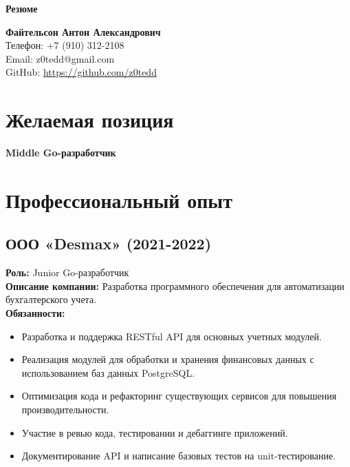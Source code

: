\documentclass[a4paper,12pt]{article}
\begin{document}
\begin{center}
    \textbf{\LARGE Резюме}
\end{center}

\begin{center}
    \textbf{\large Файтельсон Антон Александрович} \\
    Телефон: +7 (910) 312-2108 \\
    Email: z0tedd@gmail.com \\

    GitHub: \url{https://github.com/z0tedd}
\end{center}

\vspace{10pt}

\section{Желаемая позиция}
\textbf{Middle Go-разработчик}

\section{Профессиональный опыт}

\subsection*{ООО «Desmax» (2021-2022)}
\textbf{Роль:} Junior Go-разработчик \\
\textbf{Описание компании:} Разработка программного обеспечения для автоматизации бухгалтерского учета. \\
\textbf{Обязанности:}
\begin{itemize}[noitemsep]
    \item Разработка и поддержка RESTful API для основных учетных модулей.
    \item Реализация модулей для обработки и хранения финансовых данных с использованием баз данных PostgreSQL.
    \item Оптимизация кода и рефакторинг существующих сервисов для повышения производительности.
    \item Участие в ревью кода, тестировании и дебаггинге приложений.
    \item Документирование API и написание базовых тестов на unit-тестирование.
\end{itemize}
\end{document}
